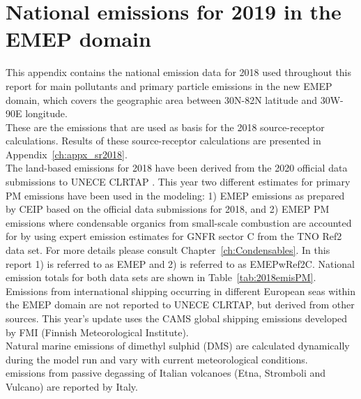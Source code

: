 \setcounter{page}{1}

\cleardoublepage
\chapter[2019 Emissions]{National emissions for 2019 in the EMEP domain}
\label{ch:appx_emis_2018}


This appendix contains the national emission data for 2018 used throughout this
report for main pollutants and  primary particle emissions in the new 
EMEP domain, which covers the geographic area between 30\degrees N-82\degrees N latitude and 30\degrees W-90\degrees E longitude. \\

These are the emissions that are used as basis
 for the 2018 source-receptor calculations. Results of these
 source-receptor calculations are presented in Appendix~\ref{ch:appx_sr2018}.\\

The land-based emissions for 2018 have been derived from the 2020
official data submissions to UNECE CLRTAP \citep{CEIP2020}.
This year two different estimates for primary PM emissions have been used in the modeling: 1) EMEP emissions as prepared by CEIP based on the official data submissions for 2018, and 2) EMEP PM emissions where condensable organics from small-scale combustion are accounted for by using expert emission estimates for GNFR sector C from the TNO Ref2 data set. For more details please consult Chapter~\ref{ch:Condensables}. In this report 1) is referred to as EMEP and 2) is referred to as EMEPwRef2C. National emission totals for both data sets are shown in Table~\ref{tab:2018emisPM}. \\

Emissions from international shipping occurring in different European seas within the EMEP domain are not reported to UNECE CLRTAP, but derived from other sources. This year's update uses the CAMS global shipping emissions \citep{CAMSemis2019}  developed by FMI (Finnish Meteorological Institute).
\\

Natural marine emissions of dimethyl sulphid (DMS) are calculated dynamically during the model run and vary with current meteorological conditions.\\

\sox emissions from passive degassing of Italian volcanoes (Etna,
Stromboli and Vulcano) are reported by
Italy. \\

